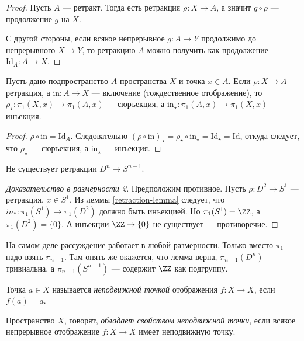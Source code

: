 \documentclass[12pt,a4paper]{article}
\newcommand{\Id}{\ensuremath{\mathrm{Id}}\xspace}
\newcommand{\incl}{\mathrm{in}}
\begin{document}
    \begin{proof}
        Пусть $A$ --- ретракт. Тогда есть ретракция $\rho: X \to A$, а значит $g \circ \rho$ --- продолжение $g$ на $X$.

        С другой стороны, если всякое непрерывное $g: A \to Y$ продолжимо до непрерывного $X \to Y$, то ретракцию $A$ можно получить как продолжение $\Id_A: A \to X$.
    \end{proof}

    \begin{lemma}\label{retraction-lemma}
        Пусть дано подпространство $A$ пространства $X$ и точка $x \in A$. Если $\rho: X \to A$ --- ретракция, а $\incl: A \to X$ --- включение (тождественное отображение), то $\rho_\star: \pi_1(X, x) \to \pi_1(A, x)$ --- сюръекция, а $\incl_\star: \pi_1(A, x) \to \pi_1(X, x)$ --- инъекция.
    \end{lemma}

    \begin{proof}
        $\rho \circ \incl = \Id_A$. Следовательно $(\rho \circ \incl)_\star = \rho_\star \circ \incl_\star = \Id_\star = \Id$, откуда следует, что $\rho_\star$ --- сюръекция, а $\incl_\star$ --- инъекция.
    \end{proof}

    \begin{theorem}[Борсука]
        Не существует ретракции $D^n \to S^{n-1}$.
    \end{theorem}

    \begin{proof}[Доказательство в размерности 2]
        Предположим противное. Пусть $\rho: D^2 \to S^1$ --- ретракция, $x \in S^1$. Из леммы \ref{retraction-lemma} следует, что $in_*: \pi_1(S^1) \to \pi_1(D^2)$ должно быть инъекцией. Но $\pi_1(S^1) = \ZZ$, а $\pi_1(D^2) = \{0\}$. А инъекции $\ZZ \to \{0\}$ не существует --- противоречие.
    \end{proof}

    \begin{remark}
        На самом деле рассуждение работает в любой размерности. Только вместо $\pi_1$ надо взять $\pi_{n-1}$. Там опять же окажется, что лемма верна, $\pi_{n-1}(D^n)$ тривиальна, а $\pi_{n-1}(S^{n-1})$ --- содержит $\ZZ$ как подгруппу.
    \end{remark}

    \begin{definition}
        Точка $a \in X$ называется \emph{неподвижной точкой} отображения $f: X \to X$, если $f(a) = a$.

        Пространство $X$, говорят, \emph{обладает свойством неподвижной точки}, если всякое непрерывное отображение $f: X \to X$ имеет неподвижную точку.
    \end{definition}
\end{document}
